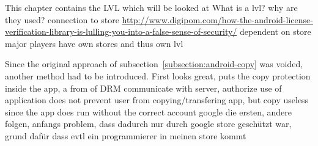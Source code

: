 This chapter contains the LVL which will be looked at\newline
What is a lvl? why are they used? connection to store\newline
\url{http://www.digipom.com/how-the-android-license-verification-library-is-lulling-you-into-a-false-sense-of-security/}\newline
dependent on store\newline
major players have own stores and thus own lvl\newline


Since the original approach of subsection~\ref{subsection:android-copy} was voided, another method had to be introduced.
First looks great, puts the copy protection inside the app, a from of DRM\newline
communicate with server, authorize use of application\newline
does not prevent user from copying/transfering app, but copy useless since the app does run without the correct account\newline
google die ersten, andere folgen, anfangs problem, dass dadurch nur durch google store geschützt war, grund dafür dass evtl ein programmierer in meinen store kommt\newline
